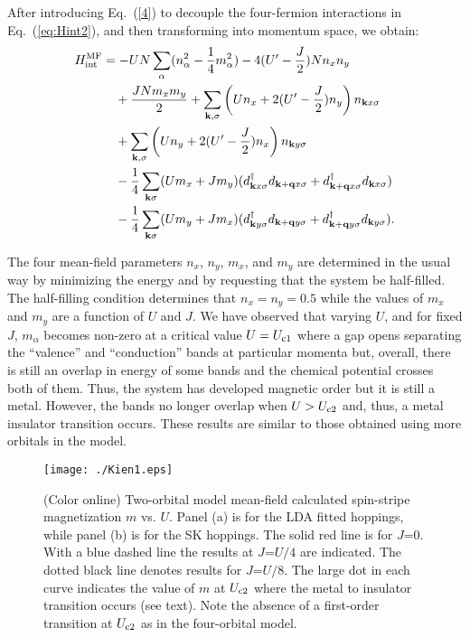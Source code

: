 \documentclass[aps,prb,superscriptaddress,preprintnumbers,
showpacs,legalpaper,twoside,twocolumn,amsmath,amssymb]{revtex4}
\begin{document}
After introducing Eq.~(\ref{4}) to decouple the four-fermion interactions
in Eq.~(\ref{eq:Hint2}), and then transforming into momentum space, we obtain:
\begin{equation}\begin{split}\label{mf2}
H^{\rm MF}_{\rm int}&=
-UN\sum_{\alpha}(n^2_{\alpha}-{1\over{4}}m^2_{\alpha})-4(U'-{J\over{2}})Nn_xn_y\\
&\quad +\frac{JNm_xm_y}{2}+\sum_{{\bf k},\sigma}\left(Un_x+2(U'-{J\over{2}})n_y\right)n_{{\bf k}x\sigma}\\
&\quad+\sum_{{\bf k},\sigma}\left(Un_y+2(U'-{J\over{2}})n_x\right)n_{{\bf k}y\sigma}\\
&\quad-{1\over{4}}\sum_{{\bf k}\sigma}(Um_x+Jm_y)(d^{\dagger}_{{\bf k}x\sigma}d_{{\bf k+q}x\sigma}
+d^{\dagger}_{{\bf k+q}x\sigma}d_{{\bf k}x\sigma})\\
&\quad-{1\over{4}}\sum_{{\bf k}\sigma}(Um_y+Jm_x)(d^{\dagger}_{{\bf k}y\sigma}d_{{\bf k+q}y\sigma}
+d^{\dagger}_{{\bf k+q}y\sigma}d_{{\bf k}y\sigma}).
\end{split}\end{equation}

The four mean-field parameters $n_x$,
$n_y$, $m_x$, and $m_y$ are determined in the usual way by minimizing the
energy and by requesting that the system be half-filled. The half-filling
condition determines that $n_x=n_y=0.5$ while the values of $m_x$ and $m_y$
are a function of $U$ and $J$. We have observed that varying $U$, and
for fixed $J$, $m_{\alpha}$ becomes non-zero at a critical value $U=U_{\rm c1}$ where
a gap opens separating
the ``valence'' and ``conduction'' bands at particular momenta but, overall,
there is still an overlap in energy of some bands and the
chemical potential crosses both of them. Thus, the system has developed magnetic order
but it is still a metal. However, the bands no longer overlap when $U>U_{\rm c2}$ and, thus,
a metal insulator transition occurs. These results are similar to those obtained
using more orbitals
in the model.


\begin{figure}
\centerline{\texttt{[image: ./Kien1.eps]}}
\vskip -0.5cm
\caption{(Color online) Two-orbital model mean-field calculated spin-stripe magnetization $m$ vs.
$U$. Panel (a) is for the LDA fitted hoppings,\cite{scalapino} while panel (b) is for the
SK hoppings.\cite{daghofer}  The solid red line is for
$J$=$0$. With a blue dashed line the results at $J$=$U/4$ are indicated. The dotted black line
denotes results for $J$=$U/8$. The large dot in each curve indicates the value of $m$ at
$U_{\rm c2}$
where the metal to insulator transition occurs (see text).
Note the absence of a first-order transition at $U_{\rm c2}$
as in the four-orbital model.
}
\label{kien1}
\end{figure}
\end{document}
